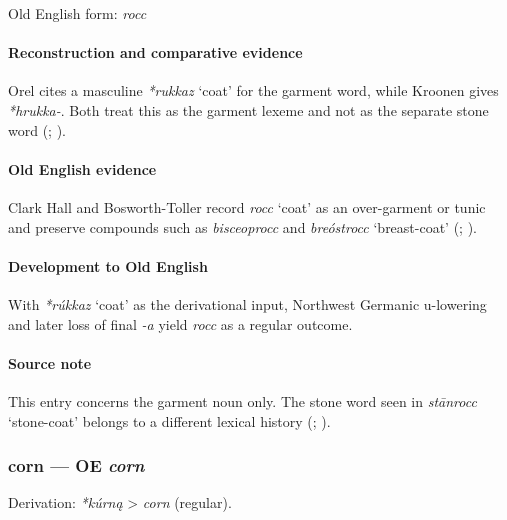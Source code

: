 \documentclass[
  british,
  a4paper,
]{article}
\providecommand{\Recon}[1]{\emph{*#1}}
\begin{document}
Old English form: \emph{rocc}

\paragraph{Reconstruction and comparative
evidence}\label{reconstruction-and-comparative-evidence-13}

Orel cites a masculine \Recon{rukkaz} `coat' for the garment word, while
Kroonen gives \emph{*hrukka-}. Both treat this as the garment lexeme and
not as the separate stone word (;
).

\paragraph{Old English evidence}\label{old-english-evidence-13}

Clark Hall and Bosworth-Toller record \emph{rocc} `coat' as an
over-garment or tunic and preserve compounds such as \emph{bisceoprocc}
and \emph{breóstrocc} `breast-coat' (; ).

\paragraph{Development to Old
English}\label{development-to-old-english-13}

With \Recon{rúkkaz} `coat' as the derivational input, Northwest Germanic
u-lowering and later loss of final \emph{-a} yield \emph{rocc} as a
regular outcome.

\paragraph{Source note}\label{source-note-2}

This entry concerns the garment noun only. The stone word seen in
\emph{stānrocc} `stone-coat' belongs to a different lexical history
(;
).

\subsubsection{\texorpdfstring{corn --- OE
\emph{corn}}{corn --- OE corn}}\label{corn-oe-corn}

Derivation: \emph{*kúrną} \textgreater{} \emph{corn} (regular).
\end{document}
